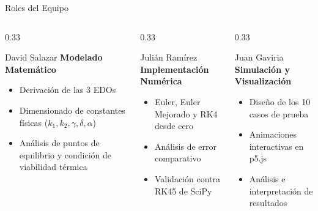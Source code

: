 \documentclass[aspectratio=169, 10pt]{beamer}
\begin{document}
\begin{frame}{Roles del Equipo}
  \begin{columns}[c]
    \begin{column}{0.33\textwidth}
      \begin{block}{David Salazar}
        \textbf{Modelado Matemático}\\[4pt]
        \small
        \begin{itemize}
          \item Derivación de las 3 EDOs
          \item Dimensionado de constantes físicas ($k_1,k_2,\gamma,\delta,\alpha$)
          \item Análisis de puntos de equilibrio y condición de viabilidad térmica
        \end{itemize}
      \end{block}
    \end{column}
    \begin{column}{0.33\textwidth}
      \begin{block}{Julián Ramírez}
        \textbf{Implementación Numérica}\\[4pt]
        \small
        \begin{itemize}
          \item Euler, Euler Mejorado y RK4 desde cero
          \item Análisis de error comparativo
          \item Validación contra RK45 de SciPy
        \end{itemize}
      \end{block}
    \end{column}
    \begin{column}{0.33\textwidth}
      \begin{block}{Juan Gaviria}
        \textbf{Simulación y Visualización}\\[4pt]
        \small
        \begin{itemize}
          \item Diseño de los 10 casos de prueba
          \item Animaciones interactivas en p5.js
          \item Análisis e interpretación de resultados
        \end{itemize}
      \end{block}
    \end{column}
  \end{columns}
\end{frame}
\end{document}
